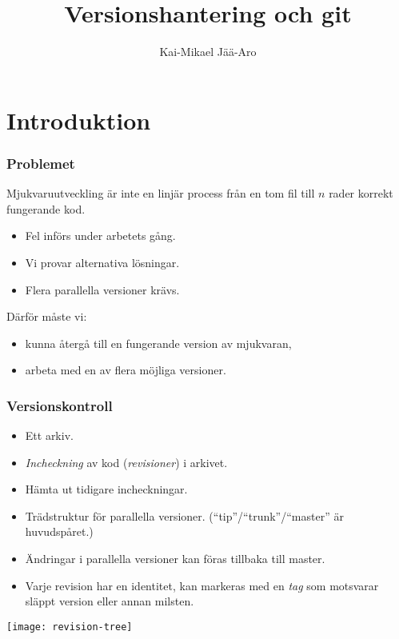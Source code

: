 \documentclass[swedish]{beamer}
\title{Versionshantering och git}
\author{Kai-Mikael Jää-Aro}
\date{}
\begin{document}
\setlength{\intextsep}{0mm}

\begin{frame}
\titlepage
\end{frame}

\section{Introduktion}
\begin{frame}
  \frametitle{Problemet}
Mjukvaruutveckling är inte en linjär process från en tom fil till \(n\) rader korrekt fungerande kod.
\begin{itemize}
\item Fel införs under arbetets gång.
\item Vi provar alternativa lösningar.
\item Flera parallella versioner krävs.
\end{itemize}

Därför måste vi:
\begin{itemize}
\item kunna återgå till en fungerande version av mjukvaran,
\item arbeta med en av flera möjliga versioner.
\end{itemize}

\end{frame}

\begin{frame}
\frametitle{Versionskontroll} 
  \begin{itemize}
  \item Ett arkiv.
  \item\emph{Incheckning} av kod (\emph{revisioner}) i arkivet.
  \item Hämta ut tidigare incheckningar.
  \item  Trädstruktur för parallella
    versioner. (``tip''/``trunk''/``master'' är huvudspåret.)
  \item Ändringar i parallella versioner kan föras tillbaka till master.
  \item Varje revision har en identitet, kan markeras med en \emph{tag} som 
motsvarar släppt version eller annan milsten. 
  \end{itemize}
\end{frame}

\begin{frame}
\texttt{[image: revision-tree]}
\end{frame}
\end{document}
